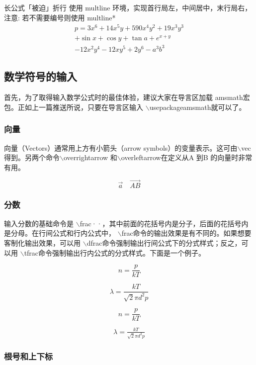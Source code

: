 \documentclass[UTF8]{ctexart}
\begin{document}
长公式「被迫」折行
使用 multline 环境，实现首行局左，中间居中，末行局右，注意: 若不需要编号则使用 multline*
\begin{multline}
p = 3x^6 + 14x^5y + 590x^4y^2 + 19x^3y^3\\ 
+ \sin{x} + \cos{y} + \tan{a} + e^{x+y} \\
- 12x^2y^4 - 12xy^5 + 2y^6 - a^3b^3
\end{multline}





\subsection{数学符号的输入}
首先，为了取得输入数学公式时的最佳体验，建议大家在导言区加载 amsmath宏包。正如上一篇推送所说，只要在导言区输入 $\backslash$usepackage{amsmath}就可以了。


\subsubsection{向量}
向量（Vectors）通常用上方有小箭头（arrow symbols）的变量表示。这可由$\backslash$vec 得到。另两个命令$\backslash$overrightarrow 和$\backslash$overleftarrow在定义从A 到B 的向量时非常有用。


\begin{displaymath}
	\vec a  \quad  \overrightarrow{AB}
\end{displaymath}


\subsubsection{分数}
输入分数的基础命令是 $\backslash$frac{·}{·}，其中前面的花括号内是分子，后面的花括号内是分母。在行间公式和行内公式中， $\backslash$frac命令的输出效果是有不同的。如果想要客制化输出效果，可以用 $\backslash$dfrac命令强制输出行间公式下的分式样式；反之，可以用 $\backslash$tfrac命令强制输出行内公式的分式样式。下面是一个例子。

$$ n=\frac{p}{kT} $$

\[
\lambda =\frac{kT}{\sqrt{2}\pi d^2p}
\]

$$ n=\dfrac{p}{kT} $$

\[
\lambda =\tfrac{kT}{\sqrt{2}\pi d^2p}
\]


\subsubsection{根号和上下标}
\end{document}
